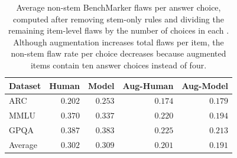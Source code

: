 \begin{table}[t]
\small
\centering
\begin{tabular}{lrrrr}
\toprule
Dataset & Human & Model & Aug-Human & Aug-Model \\
\midrule
ARC & $0.202$ & $0.253$ & $0.174$ & $0.179$ \\
MMLU & $0.370$ & $0.337$ & $0.220$ & $0.194$ \\
GPQA & $0.387$ & $0.383$ & $0.225$ & $0.213$ \\
\midrule
Average & $0.302$ & $0.309$ & $0.201$ & $0.191$ \\
\bottomrule
\end{tabular}
\vspace{-2ex}
\caption{\small Average non-stem BenchMarker flaws per answer choice, computed after removing stem-only rules and dividing the remaining item-level flaws by the number of choices in each \mcq{}. Although augmentation increases total flaws per item, the non-stem flaw rate per choice decreases because augmented items contain ten answer choices instead of four.}
\label{table:benchmarker-flaws-per-choice}
\vspace{-1ex}
\end{table}
